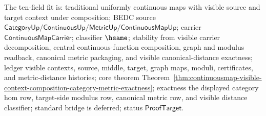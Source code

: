 The ten-field fit is: traditional uniformly continuous maps with visible
source and target context under composition; BEDC source
$\mathsf{CategoryUp}/\mathsf{ContinuousUp}/\mathsf{MetricUp}/
\mathsf{ContinuousMapUp}$; carrier $\mathsf{ContinuousMapCarrier}$;
classifier $\hsame$; stability from visible carrier decomposition, central
continuous-function composition, graph and modulus readback, canonical metric
packaging, and visible canonical-distance exactness; ledger visible contexts,
source, middle, target, graph maps, moduli, certificates, and metric-distance
histories; core theorem
Theorem~\ref{thm:continuousmap-visible-context-composition-category-metric-exactness};
exactness the displayed category hom row, target-side modulus row, canonical
metric row, and visible distance classifier; standard bridge is deferred;
status $\mathsf{ProofTarget}$.
